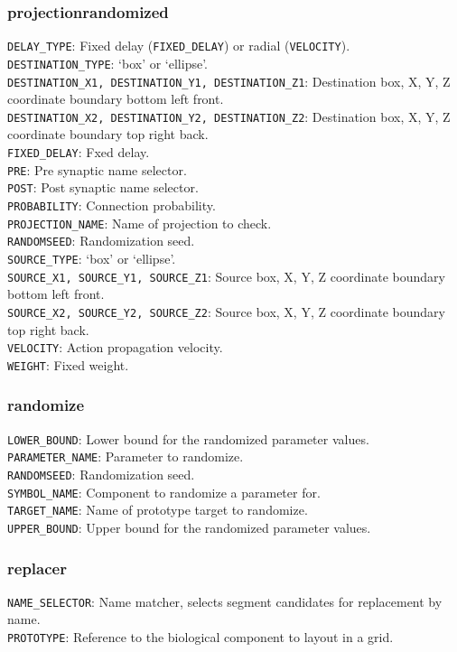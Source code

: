 \documentclass[12pt]{article}
\begin{document}
\subsubsection{projectionrandomized}
{\tt DELAY\_TYPE}: Fixed delay ({\tt FIXED\_DELAY}) or radial ({\tt VELOCITY}).\\
{\tt DESTINATION\_TYPE}: `box' or `ellipse'.\\
{\tt DESTINATION\_X1, DESTINATION\_Y1, DESTINATION\_Z1}: Destination box, X, Y, Z coordinate boundary bottom left front.\\
{\tt DESTINATION\_X2, DESTINATION\_Y2, DESTINATION\_Z2}: Destination box, X, Y, Z coordinate boundary top right back.\\
{\tt FIXED\_DELAY}: Fxed delay.\\
{\tt PRE}:  Pre synaptic name selector.\\
{\tt POST}: Post synaptic name selector.\\
{\tt PROBABILITY}: Connection probability.\\
{\tt PROJECTION\_NAME}: Name of projection to check.\\
{\tt RANDOMSEED}: Randomization seed.\\
{\tt SOURCE\_TYPE}: `box' or `ellipse'.\\
{\tt SOURCE\_X1, SOURCE\_Y1, SOURCE\_Z1}: Source box, X, Y, Z coordinate boundary bottom left front.\\
{\tt SOURCE\_X2, SOURCE\_Y2, SOURCE\_Z2}: Source box, X, Y, Z coordinate boundary top right back.\\
{\tt VELOCITY}: Action propagation velocity.\\
{\tt WEIGHT}: Fixed weight.
\subsubsection{randomize}
{\tt LOWER\_BOUND}: Lower bound for the randomized parameter values.\\{\tt PARAMETER\_NAME}: Parameter to randomize.\\{\tt RANDOMSEED}: Randomization seed.\\{\tt SYMBOL\_NAME}: Component to randomize a parameter for.\\{\tt TARGET\_NAME}: Name of prototype target to randomize.\\{\tt UPPER\_BOUND}: Upper bound for the randomized parameter values.
\subsubsection{replacer}
{\tt NAME\_SELECTOR}: Name matcher, selects segment candidates for replacement by name.\\{\tt PROTOTYPE}: Reference to the biological component to layout in a grid.
\end{document}
